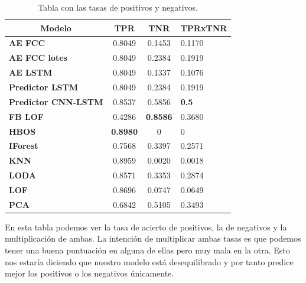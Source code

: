 \begin{table}[H]
	\centering
	\begin{tabular}{|l|c|c|l|}
		\hline
		\multicolumn{1}{|c|}{\textbf{Modelo}} & \textbf{TPR}    & \textbf{TNR}    & \multicolumn{1}{c|}{\textbf{TPRxTNR}} \\ \hline
		\textbf{AE FCC}                       & 0.8049          & 0.1453          & 0.1170                                \\ \hline
		\textbf{AE FCC lotes}                 & 0.8049          & 0.2384          & 0.1919                                \\ \hline
		\textbf{AE LSTM}                      & 0.8049          & 0.1337          & 0.1076                                \\ \hline
		\textbf{Predictor LSTM}               & 0.8049          & 0.2384          & 0.1919                                \\ \hline
		\textbf{Predictor CNN-LSTM}           & 0.8537          & 0.5856          & \textbf{0.5}                          \\ \hline
		\textbf{FB LOF}                       & 0.4286          & \textbf{0.8586} & 0.3680                                \\ \hline
		\textbf{HBOS}                         & \textbf{0.8980} & 0               & 0                                     \\ \hline
		\textbf{IForest}                      & 0.7568          & 0.3397          & 0.2571                                \\ \hline
		\textbf{KNN}                          & 0.8959          & 0.0020          & 0.0018                                \\ \hline
		\textbf{LODA}                         & 0.8571          & 0.3353          & 0.2874                                \\ \hline
		\textbf{LOF}                          & 0.8696          & 0.0747          & 0.0649                                \\ \hline
		\textbf{PCA}                          & 0.6842          & 0.5105          & 0.3493                                \\ \hline
	\end{tabular}
	\caption{Tabla con las tasas de positivos y negativos.}
	\label{tabla:resultados4}
\end{table}

En esta tabla podemos ver la tasa de acierto de positivos, la de negativos y la multiplicación de ambas. La intención de multiplicar ambas tasas es que podemos tener una buena puntuación en alguna de ellas pero muy mala en la otra. Esto nos estaría diciendo que nuestro modelo está desequilibrado y por tanto predice mejor los positivos o los negativos únicamente. 

